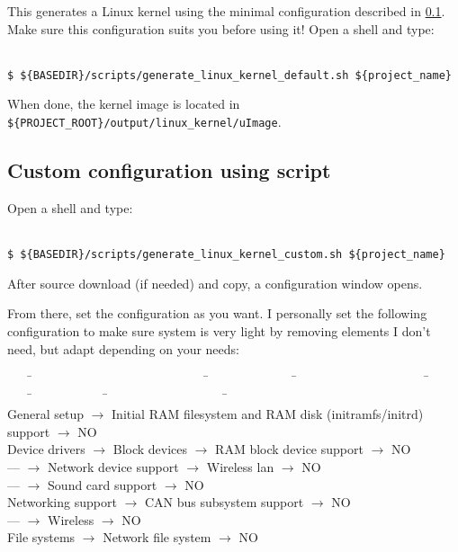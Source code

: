 \documentclass[openany,a4paper]{book}
\begin{document}
This generates a Linux kernel using the minimal configuration described in \ref{section_manual_kernel}.
Make sure this configuration suits you before using it!
Open a shell and type:

\begin{tabbing}
\kill \hspace{1cm} \= \\
\> \texttt{\$ \$\{BASEDIR\}/scripts/generate\_linux\_kernel\_default.sh \$\{project\_name\}}\\
\end{tabbing}

When done, the kernel image is located in \nolinkurl{${PROJECT_ROOT}/output/linux_kernel/uImage}.

\subsection{Custom configuration using script}\label{section_manual_kernel}

Open a shell and type:

\begin{tabbing}
\kill \hspace{1cm} \= \\
\> \texttt{\$ \$\{BASEDIR\}/scripts/generate\_linux\_kernel\_custom.sh \$\{project\_name\}}\\
\end{tabbing}

After source download (if needed) and copy, a configuration window opens.

From there, set the configuration as you want.
I personally set the following configuration to make sure system is very light by removing elements I don't need, but adapt depending on your needs:

\begin{tabbing}
\kill \ \ \ \= \ \ \ \ \ \ \ \ \ \ \ \ \ \ \ \ \ \ \ \ \ \ \ \ \ \ \ \ \= \ \ \ \ \ \ \ \ \ \ \ \ \ \ \= \ \ \ \ \ \ \ \ \ \ \ \ \ \ \ \ \ \ \ \ \ \= \ \ \ \ \ \ \ \ \ \= \ \ \ \ \ \ \ \ \ \ \ \ \= \ \ \ \ \ \ \ \ \ \ \ \ \ \ \ \ \ \ \ \= \ \ \ \ \ \ \ \ \ \ \ \ \ \ \ \ \ \ \ \= \\
\> General setup      \> $\rightarrow$ Initial RAM filesystem and RAM disk (initramfs/initrd) support \>\>\>\>\>\> $\rightarrow$ NO \\
\> Device drivers     \> $\rightarrow$ Block devices             \>\>\> $\rightarrow$ RAM block device support \>\>\> $\rightarrow$ NO \\
\> ---                \> $\rightarrow$ Network device support    \>\>\> $\rightarrow$ Wireless lan             \>\>\> $\rightarrow$ NO \\
\> ---                \> $\rightarrow$ Sound card support        \>\>\> $\rightarrow$ NO \\
\> Networking support \> $\rightarrow$ CAN bus subsystem support \>\>\> $\rightarrow$ NO \\
\> ---                \> $\rightarrow$ Wireless                  \>\>\> $\rightarrow$ NO \\
\> File systems       \> $\rightarrow$ Network file system       \>\>\> $\rightarrow$ NO \\
\end{tabbing}
\end{document}
